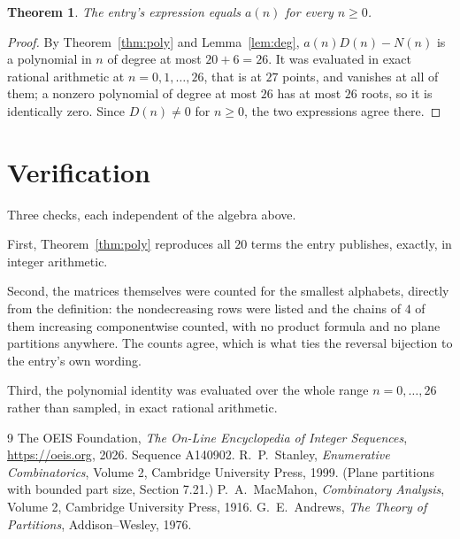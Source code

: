 \documentclass[11pt,a4paper]{article}
\theoremstyle{plain}
\newtheorem{theorem}{Theorem}
\theoremstyle{definition}
\begin{document}
\begin{theorem}
The entry's expression equals $a(n)$ for every $n\ge0$.
\end{theorem}

\begin{proof}
By Theorem~\ref{thm:poly} and Lemma~\ref{lem:deg}, $a(n)D(n)-N(n)$ is a polynomial in $n$
of degree at most $20+6=26$. It was evaluated in exact rational arithmetic at
$n=0,1,\dots,26$, that is at $27$ points, and vanishes at all of them; a nonzero polynomial
of degree at most $26$ has at most $26$ roots, so it is identically zero. Since $D(n)\neq0$
for $n\ge0$, the two expressions agree there.
\end{proof}

\section{Verification}

Three checks, each independent of the algebra above.

First, Theorem~\ref{thm:poly} reproduces all $20$ terms the entry publishes,
exactly, in integer arithmetic.

Second, the matrices themselves were counted for the smallest alphabets, directly from the
definition: the nondecreasing rows were listed and the chains of $4$ of them increasing
componentwise counted, with no product formula and no plane partitions anywhere. The counts
agree, which is what ties the reversal bijection to the entry's own wording.

Third, the polynomial identity was evaluated over the whole range $n=0,\dots,26$ rather than
sampled, in exact rational arithmetic.

\begin{thebibliography}{9}
 The OEIS Foundation, \emph{The On-Line Encyclopedia of Integer
Sequences}, \url{https://oeis.org}, 2026. Sequence A140902.
 R.~P.~Stanley, \emph{Enumerative Combinatorics}, Volume 2, Cambridge
University Press, 1999. (Plane partitions with bounded part size, Section 7.21.)
 P.~A.~MacMahon, \emph{Combinatory Analysis}, Volume 2, Cambridge
University Press, 1916.
 G.~E.~Andrews, \emph{The Theory of Partitions}, Addison--Wesley, 1976.
\end{thebibliography}
\end{document}
